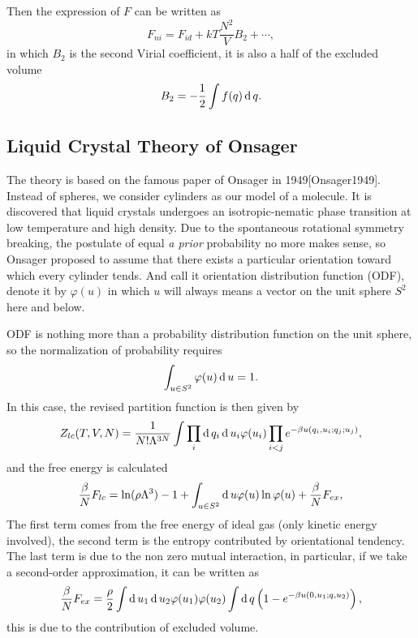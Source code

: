 Then the expression of $F$ can be written as
\begin{equation}
	F_{ni} = F_{id} + kT\frac{N^2}{V}B_2+\cdots,
\end{equation}
in which $B_2$ is the second Virial coefficient, it is also a half of the excluded volume
\begin{equation}
	B_2 = -\frac{1}{2}\int f(q)\operatorname{d}q.
\end{equation}


\subsection{Liquid Crystal Theory of Onsager}
The theory is based on the famous paper of Onsager in 1949[Onsager1949]. Instead of spheres, we consider cylinders as our model of a molecule. It is discovered that liquid crystals undergoes an isotropic-nematic phase transition at low temperature and high density. Due to the spontaneous rotational symmetry breaking, the postulate of equal \textit{a prior} probability no more makes sense, so Onsager proposed to assume that there exists a particular orientation toward which every cylinder tends. And call it orientation distribution function (ODF), denote it by $\varphi(u)$ in which $u$ will always means a vector on the unit sphere $S^2$ here and below.

ODF is nothing more than a probability distribution function on the unit sphere, so the normalization of probability requires
\begin{equation}
	\int_{u\in S^2}\varphi(u)\operatorname{d}u =1.
\end{equation}
In this case, the revised partition function is then given by
\begin{equation}
	Z_{lc}(T,V,N) = \frac{1}{N!\Lambda^{3N}}\int\prod_i\operatorname{d}q_i\operatorname{d}u_i\varphi(u_i)\prod_{i<j}e^{-\beta u(q_i,u_i;q_j;u_j)},
\end{equation}
and the free energy is calculated
\begin{equation}
	\frac{\beta}{N} F_{lc} = \ln(\rho\Lambda^3) - 1 + \int_{u\in S^2}\operatorname{d}u \varphi(u)\ln\varphi(u) +\frac{\beta}{N}F_{ex},
\end{equation}
The first term comes from the free energy of ideal gas (only kinetic energy involved), the second term is the entropy contributed by orientational tendency. The last term is due to the non zero mutual interaction, in particular, if we take a second-order approximation, it can be written as
\begin{equation}
	\frac{\beta}{N}F_{ex} = \frac{\rho}{2}\int \operatorname{d}u_1\operatorname{d}u_2\varphi(u_1)\varphi(u_2)\int\operatorname{d}q\left(1-e^{-\beta u(0,u_1;q,u_2)}\right),
\end{equation}
this is due to the contribution of excluded volume.

